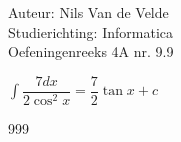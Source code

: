 \documentclass[a4paper]{article}
\begin{document}
  
\noindent \large Auteur: Nils Van de Velde \\
\noindent \large Studierichting: Informatica\\
\noindent \large Oefeningenreeks 4A nr. 9.9\\

\medskip

\normalsize

$\displaystyle\int\dfrac{7dx}{2\cos^2x}=\dfrac{7}{2}\tan x+c$\\

\begin{thebibliography}{999}
\end{thebibliography}
\end{document}
